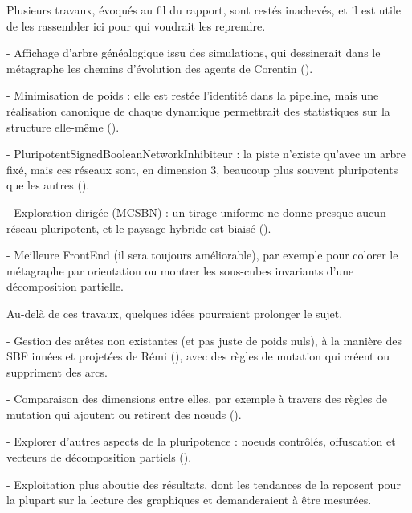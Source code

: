 \documentclass[12pt, a4paper]{article}
\begin{document}
\vspace{5pt}
Plusieurs travaux, évoqués au fil du rapport, sont restés inachevés, et il est utile de les rassembler ici pour qui voudrait les reprendre.

- Affichage d'arbre généalogique issu des simulations, qui dessinerait dans le métagraphe les chemins d'évolution des agents de Corentin ().

- Minimisation de poids : elle est restée l'identité dans la pipeline, mais une réalisation canonique de chaque dynamique permettrait des statistiques sur la structure elle-même ().

- PluripotentSignedBooleanNetworkInhibiteur : la piste n'existe qu'avec un arbre fixé, mais ces réseaux sont, en dimension 3, beaucoup plus souvent pluripotents que les autres ().

- Exploration dirigée (MCSBN) : un tirage uniforme ne donne presque aucun réseau pluripotent, et le paysage hybride est biaisé ().

- Meilleure FrontEnd (il sera toujours améliorable), par exemple pour colorer le métagraphe par orientation ou montrer les sous-cubes invariants d'une décomposition partielle.

\vspace{5pt}
Au-delà de ces travaux, quelques idées pourraient prolonger le sujet.

- Gestion des arêtes non existantes (et pas juste de poids nuls), à la manière des SBF innées et projetées de Rémi (), avec des règles de mutation qui créent ou suppriment des arcs.

- Comparaison des dimensions entre elles, par exemple à travers des règles de mutation qui ajoutent ou retirent des nœuds ().

- Explorer d'autres aspects de la pluripotence : noeuds contrôlés, offuscation et vecteurs de décomposition partiels ().

- Exploitation plus aboutie des résultats, dont les tendances de la  reposent pour la plupart sur la lecture des graphiques et demanderaient à être mesurées.
\end{document}

